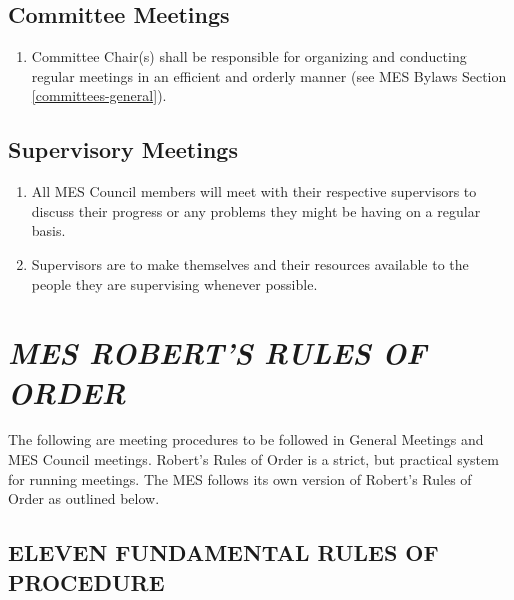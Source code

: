 \hypertarget{committee-meetings}{%
 \subsection{Committee Meetings}
 \label{committee-meetings}}
\begin{enumerate}
 \item
  Committee Chair(s) shall be responsible for organizing and conducting
  regular meetings in an efficient and orderly manner (see MES Bylaws
  Section \ref{committees-general}).

\end{enumerate}

\hypertarget{supervisory-meetings}{%
 \subsection{Supervisory Meetings}
 \label{supervisory-meetings}}
\begin{enumerate}
 \item
  All MES Council members will meet with their respective supervisors to
  discuss their progress or any problems they might be having on a
  regular basis.
 \item
  Supervisors are to make themselves and their resources available to
  the people they are supervising whenever possible.
\end{enumerate}

\hypertarget{mes-roberts-rules-of-order}{%
 \section{\texorpdfstring{\emph{MES ROBERT'S RULES OF
     ORDER}}{MES ROBERT'S RULES OF ORDER}}
 \label{mes-roberts-rules-of-order}}
The following are meeting procedures to be followed in General Meetings
and MES Council meetings. Robert's Rules of Order is a strict, but
practical system for running meetings. The MES follows its own version
of Robert's Rules of Order as outlined below.

\hypertarget{eleven-fundamental-rules-of-procedure}{%
 \subsection{ELEVEN FUNDAMENTAL RULES OF
  PROCEDURE}
 \label{eleven-fundamental-rules-of-procedure}}

